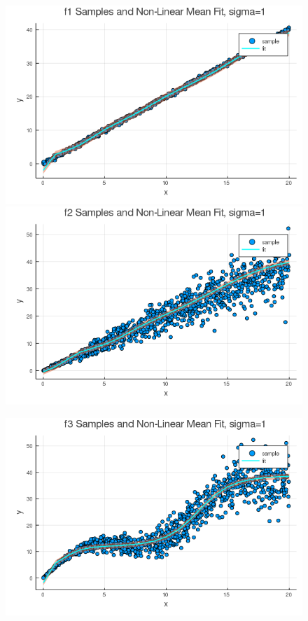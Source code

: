 \documentclass[12pt,letter]{article}
\begin{document}
\begin{enumerate}
\begin{figure}[h]
  \centering
  \includegraphics[width=13cm,keepaspectratio]{imgs/2_5_2_4_1.png}
  \includegraphics[width=13cm,keepaspectratio]{imgs/2_5_2_4_2.png}
\end{figure}
\begin{figure}[h]
  \centering
  \includegraphics[width=13cm,keepaspectratio]{imgs/2_5_2_4_3.png}
\end{figure}
\end{enumerate}
\end{document}
